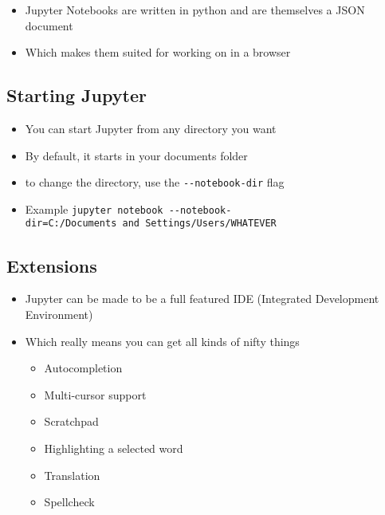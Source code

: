 \documentclass[10pt,parskip=half,
	toc=sectionentrywithdots,
	bibliography=totocnumbered,
	captions=tableheading,numbers=noendperiod]{scrartcl}
\providecommand{\tightlist}{%
  \setlength{\itemsep}{0pt}\setlength{\parskip}{0pt}}
\begin{document}
\begin{itemize}
\tightlist
\item
  Jupyter Notebooks are written in python and are themselves a JSON
  document
\end{itemize}

\begin{itemize}
\tightlist
\item
  Which makes them suited for working on in a browser
\end{itemize}

\hypertarget{starting-jupyter}{%
\subsection{Starting Jupyter}\label{starting-jupyter}}

\begin{itemize}
\tightlist
\item
  You can start Jupyter from any directory you want
\item
  By default, it starts in your documents folder
\item
  to change the directory, use the \texttt{-\/-notebook-dir} flag
\item
  Example
  \texttt{jupyter\ notebook\ -\/-notebook-dir=C:/Documents\ and\ Settings/Users/WHATEVER}
\end{itemize}

\hypertarget{extensions}{%
\subsection{Extensions}\label{extensions}}

\begin{itemize}
\tightlist
\item
  Jupyter can be made to be a full featured IDE (Integrated Development
  Environment)
\item
  Which really means you can get all kinds of nifty things

  \begin{itemize}
  \tightlist
  \item
    Autocompletion
  \item
    Multi-cursor support
  \item
    Scratchpad
  \item
    Highlighting a selected word
  \item
    Translation
  \item
    Spellcheck
  \end{itemize}
\end{itemize}
\end{document}
